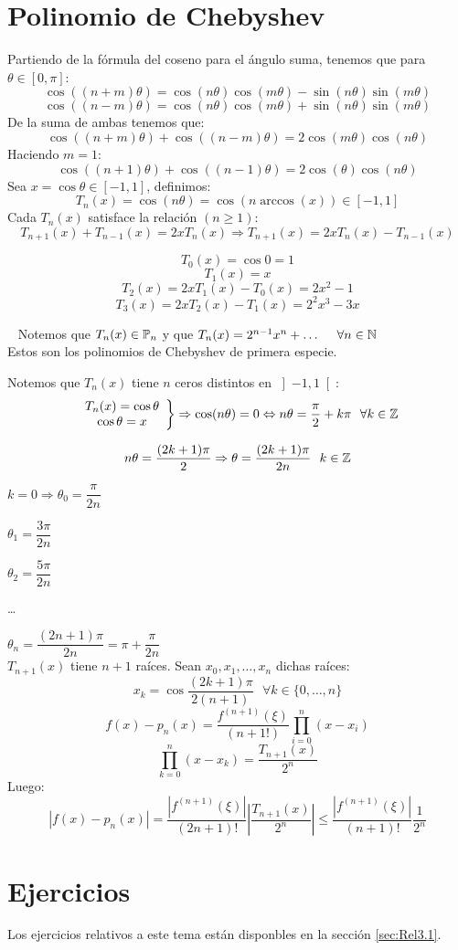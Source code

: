 \section{Polinomio de Chebyshev}
\noindent
Partiendo de la fórmula del coseno para el ángulo suma, tenemos que para $\theta \in [0, \pi]$:
$$\cos((n+m)\theta) = \cos(n\theta)\cos(m\theta) - \sin(n\theta)\sin(m\theta)$$
$$\cos((n-m)\theta) = \cos(n\theta)\cos(m\theta) + \sin(n\theta)\sin(m\theta)$$
De la suma de ambas tenemos que:
$$\cos((n+m)\theta) + \cos((n-m)\theta) = 2\cos(m\theta)\cos(n\theta)$$
Haciendo $m=1$:
$$\cos((n+1)\theta) + \cos((n-1)\theta) = 2\cos(\theta)\cos(n\theta)$$
Sea $x = \cos\theta \in [-1,1]$, definimos:
$$T_n(x) = \cos(n\theta) = \cos(n \arccos(x)) \in [-1, 1]$$
Cada $T_n(x)$ satisface la relación $(n \geq 1)$:
$$T_{n+1}(x) + T_{n-1}(x) = 2xT_n(x) \Rightarrow T_{n+1}(x) = 2xT_n(x) - T_{n-1}(x)$$

$$T_0(x) = \cos0 = 1$$
$$T_1(x) = x$$
$$T_2(x) = 2xT_1(x) - T_0(x) = 2x^2-1$$
$$T_3(x) = 2xT_2(x) - T_1(x) = 2^2x^3-3x$$

\ \newline
Notemos que $T_n(x) \in \mathbb{P}_n$ y que $T_n(x) = 2^{n-1}x^n + \ldots ~~~~\forall n \in \mathbb N$\\

\noindent
Estos son los polinomios de Chebyshev de primera especie.

\bigskip
\noindent
Notemos que $T_n(x)$ tiene $n$ ceros distintos en $\left]-1,1\right[$:
$$\left.\begin{array}{c}
        T_n(x) = \cos\theta \\
        \cos\theta = x
    \end{array}\right\} \Rightarrow \cos(n\theta) = 0 \Leftrightarrow n\theta = \frac{\pi}{2}+k\pi~~\forall
    k \in \mathbb Z$$

$$n\theta = \dfrac{(2k+1)\pi}{2} \Rightarrow \theta = \dfrac{(2k+1)\pi}{2n}~~k \in \mathbb Z $$

$k=0 \Rightarrow \theta_0 = \dfrac{\pi}{2n}$\par
$\theta_1 = \dfrac{3\pi}{2n}$\par
$\theta_2 = \dfrac{5\pi}{2n}$\par
\ldots \par
$\theta_n = \dfrac{(2n+1)\pi}{2n} = \pi + \dfrac{\pi}{2n}$\\

\bigskip
\noindent
$T_{n+1}(x)$ tiene $n+1$ raíces. Sean $x_0, x_1, \ldots, x_n$ dichas raíces:
$$x_k = \cos \dfrac{(2k+1)\pi}{2(n+1)}~~~\forall k \in \{0, \ldots, n\}$$
$$f(x) - p_n(x) = \dfrac{f^{(n+1)}(\xi)}{(n+1!)} \prod_{i=0}^n (x-x_i)$$
$$\prod_{k=0}^n (x-x_k) = \dfrac{T_{n+1}(x)}{2^n}$$
Luego:
$$|f(x) - p_n(x)| = \dfrac{|f^{(n+1)}(\xi)|}{(2n+1)!} \left| \dfrac{T_{n+1}(x)}{2^n} \right| \leq
    \dfrac{|f^{(n+1)}(\xi)|}{(n+1)!} \dfrac{1}{2^n}$$


\section{Ejercicios}
Los ejercicios relativos a este tema están disponbles en la sección \ref{sec:Rel3.1}.